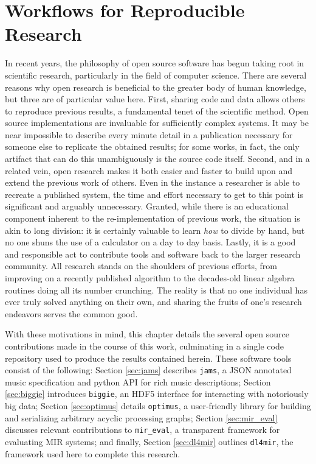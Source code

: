 

\graphicspath{{7/figures/}}

\chapter{Workflows for Reproducible Research}
\label{chp:reproducibility}

In recent years, the philosophy of open source software has begun taking root in scientific research, particularly in the field of computer science.
There are several reasons why open research is beneficial to the greater body of human knowledge, but three are of particular value here.
First, sharing code and data allows others to reproduce previous results, a fundamental tenet of the scientific method.
Open source implementations are invaluable for sufficiently complex systems.
It may be near impossible to describe every minute detail in a publication necessary for someone else to replicate the obtained results;
for some works, in fact, the only artifact that can do this unambiguously is the source code itself.
Second, and in a related vein, open research makes it both easier and faster to build upon and extend the previous work of others.
Even in the instance a researcher is able to recreate a published system, the time and effort necessary to get to this point is significant and arguably unnecessary.
Granted, while there is an educational component inherent to the re-implementation of previous work, the situation is akin to long division:
it is certainly valuable to learn \emph{how} to divide by hand, but no one shuns the use of a calculator on a day to day basis.
Lastly, it is a good and responsible act to contribute tools and software back to the larger research community.
All research stands on the shoulders of previous efforts, from improving on a recently published algorithm to the decades-old linear algebra routines doing all its number crunching.
The reality is that no one individual has ever truly solved anything on their own, and sharing the fruits of one's research endeavors serves the common good.

With these motivations in mind, this chapter details the several open source contributions made in the course of this work, culminating in a single code repository used to produce the results contained herein.
These software tools consist of the following:
Section \ref{sec:jams} describes \texttt{jams}, a JSON annotated music specification and python API for rich music descriptions;
Section \ref{sec:biggie} introduces \texttt{biggie}, an HDF5 interface for interacting with notoriously big data;
Section \ref{sec:optimus} details \texttt{optimus}, a user-friendly library for building and serializing arbitrary acyclic processing graphs;
Section \ref{sec:mir_eval} discusses relevant contributions to \texttt{mir\_eval}, a transparent framework for evaluating MIR systems;
and finally, Section \ref{sec:dl4mir} outlines \texttt{dl4mir}, the framework used here to complete this research.


